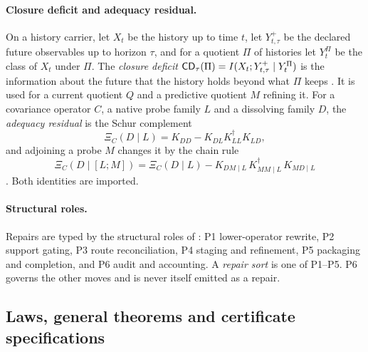 \paragraph{Closure deficit and adequacy residual.} On a history carrier, let $X_t$ be the history up to
time $t$, let $Y^+_{t,\tau}$ be the declared future observables up to horizon $\tau$, and for a quotient
$\Pi$ of histories let $Y^\Pi_t$ be the class of $X_t$ under $\Pi$. The \emph{closure deficit}
$\mathsf{CD}_\tau(\Pi) = I(X_t; Y^+_{t,\tau} \mid Y^\Pi_t)$ is the information about the future that the
history holds beyond what $\Pi$ keeps \citep{Tsiokos2026FoundIII}. It is used for a current quotient
$Q$ and a predictive quotient $M$ refining it. For a covariance
operator $C$, a native probe family $L$ and a dissolving family $D$, the \emph{adequacy residual} is
the Schur complement
\begin{equation}\label{eq:xi}
  \Xi_C(D \mid L) = K_{DD} - K_{DL} K_{LL}^{\dagger} K_{LD},
\end{equation}
and adjoining a probe $M$ changes it by the chain rule
\begin{equation}\label{eq:xi-chain}
  \Xi_C(D \mid [L; M]) = \Xi_C(D \mid L) - K_{DM\mid L}\, K_{MM\mid L}^{\dagger}\, K_{MD\mid L}
\end{equation}
\citep{Tsiokos2026Adequacy}. Both identities are imported.

\paragraph{Structural roles.} Repairs are typed by the structural roles of \FoundI{}:
P1 lower-operator rewrite, P2 support gating, P3 route reconciliation, P4 staging and refinement,
P5 packaging and completion, and P6 audit and accounting. A \emph{repair sort} is one of P1--P5.
P6 governs the other moves and is never itself emitted as a repair.

\subsection{Laws, general theorems and certificate specifications}\label{sec:setting-status}

